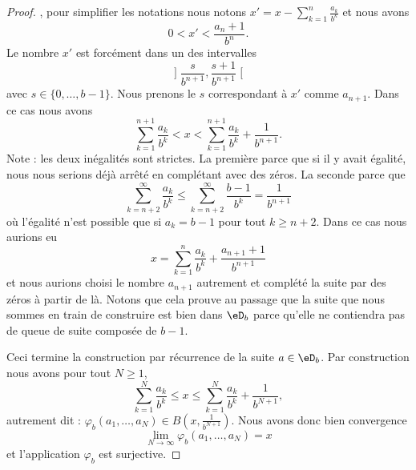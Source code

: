\begin{proof}
	, pour simplifier les notations nous notons \( x'=x-\sum_{k=1}^{n}\frac{ a_k }{ b^k }\) et nous avons
	\begin{equation}
		0<x'<\frac{ a_n+1 }{ b^n }.
	\end{equation}
	Le nombre \( x'\) est forcément dans un des intervalles
	\begin{equation}
		\mathopen] \frac{ s }{ b^{n+1} } , \frac{ s+1 }{ b^{n+1} } \mathclose[
	\end{equation}
	avec \( s\in\{ 0,\ldots, b-1 \}\). Nous prenons le \( s\) correspondant à \( x'\) comme \( a_{n+1}\). Dans ce cas nous avons
	\begin{equation}
		\sum_{k=1}^{n+1}\frac{ a_k }{ b^k }< x<\sum_{k=1}^{n+1}\frac{ a_k }{ b^k }+\frac{1}{ b^{n+1} }.
	\end{equation}
	Note : les deux inégalités sont strictes. La première parce que si il y avait égalité, nous nous serions déjà arrêté en complétant avec des zéros. La seconde parce que
	\begin{equation}
		\sum_{k=n+2}^{\infty}\frac{ a_k }{ b^k }\leq \sum_{k=n+2}^{\infty}\frac{ b-1 }{ b^k }=\frac{1}{ b^{n+1} }
	\end{equation}
	où l'égalité n'est possible que si \( a_k=b-1\) pour tout \( k\geq n+2\). Dans ce cas nous aurions eu
	\begin{equation}
		x=\sum_{k=1}^{n}\frac{ a_k }{ b^k }+\frac{ a_{n+1}+1 }{ b^{n+1} }
	\end{equation}
	et nous aurions choisi le nombre \( a_{n+1}\) autrement et complété la suite par des zéros à partir de là. Notons que cela prouve au passage que la suite que nous sommes en train de construire est bien dans \( \eD_b\) parce qu'elle ne contiendra pas de queue de suite composée de \( b-1\).

	Ceci termine la construction par récurrence de la suite \( a\in \eD_b\). Par construction nous avons pour tout \( N\geq 1\),
	\begin{equation}
		\sum_{k=1}^N\frac{ a_k }{ b^k }\leq x\leq \sum_{k=1}^N\frac{ a_k }{ b^k }+\frac{1}{ b^{N+1} },
	\end{equation}
	autrement dit : \( \varphi_b(a_1,\ldots, a_N)\in B(x,\frac{1}{ b^{N+1} })\). Nous avons donc bien convergence
	\begin{equation}
		\lim_{N\to \infty} \varphi_b(a_1,\ldots, a_N)=x
	\end{equation}
	et l'application \( \varphi_b\) est surjective.
\end{proof}

